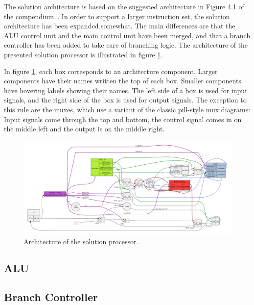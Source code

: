 The solution architecture is based on the suggested architecture in Figure 4.1 of the compendium~\cite[p.115]{compendium}.
In order to support a larger instruction set, the solution architecture has been expanded somewhat.
The main differences are that the ALU control unit and the main control unit have been merged, and that a branch controller has been added to take care of branching logic.
The architecture of the presented solution processor is illustrated in figure \ref{figure:cpu-architecture}.

In figure \ref{figure:cpu-architecture}, each box corresponds to an architecture component.
Larger components have their names written the top of each box.
Smaller components have hovering labels showing their names.
The left side of a box is used for input signals, and the right side of the box is used for output signals.
The exception to this rule are the muxes, which use a variant of the classic pill-style mux diagrams: Input signals come through the top and bottom, the control signal comes in on the middle left and the output is on the middle right.

\begin{figure}[h!]
	\begin{center}
		\includegraphics[keepaspectratio, height=\textheight, width=\textwidth]{graphics/cpu-architecture/cpu-architecture-color.pdf}
		\caption{Architecture of the solution processor.}
		\label{figure:cpu-architecture}
	\end{center}
\end{figure}

\subsection{ALU}



\subsection{Branch Controller}

